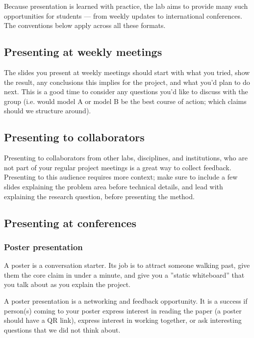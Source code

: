 \documentclass[11pt, letterpaper]{article}
\begin{document}
Because presentation is learned with practice, the lab aims to provide many such opportunities for students --- from weekly updates to international conferences. The conventions below apply across all these formats.

\subsection{Presenting at weekly meetings}

The slides you present at weekly meetings should start with what you tried, show the result, any conclusions this implies for the project, and what you'd plan to do next. This is a good time to consider any questions you'd like to discuss with the group (i.e. would model A or model B be the best course of action; which claims should we structure around). 

\subsection{Presenting to collaborators}

Presenting to collaborators from other labs, disciplines, and institutions, who are not part of your regular project meetings is a great way to collect feedback. Presenting to this audience requires more context; make sure to include a few slides explaining the problem area before technical details, and
lead with explaining the research question, before presenting the method. 

\subsection{Presenting at conferences} 

\subsubsection*{Poster presentation} 

A poster is a conversation starter. Its job is to attract someone walking past, give them the core claim in under a minute, and give you a ''static whiteboard'' that you talk about as you explain the project. 


A poster presentation is a networking and feedback opportunity. It is a success if person(s) coming to your poster express interest in reading the paper (a poster should have a QR link), express interest in working together, or ask interesting questions that we did not think about.
\end{document}

